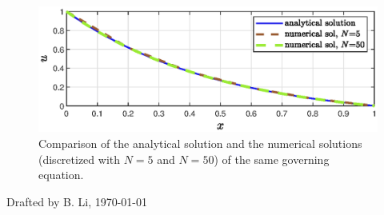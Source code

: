 \documentclass[a4paper]{article}
\begin{document}
\begin{figure}[H]
    \centering
    \includegraphics{img/compare_sols.eps}
    \caption{Comparison of the analytical solution and the numerical solutions (discretized with $N=5$ and $N=50$) of the same governing equation. }
    \label{fig:compare_sol}
\end{figure}

\vfill
{\small \color{gray}Drafted by B. Li, \today}
% 
\end{document}
